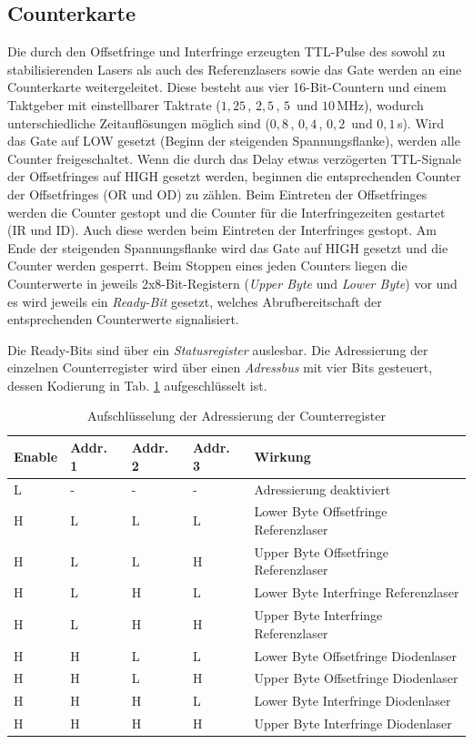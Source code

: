 \subsection{Counterkarte}\label{subsec:counterkarte}
Die durch den Offsetfringe und Interfringe erzeugten
TTL-Pulse des sowohl zu stabilisierenden Lasers als auch des Referenzlasers
sowie das Gate werden an eine Counterkarte weitergeleitet. Diese besteht aus
vier 16-Bit-Countern und einem Taktgeber mit einstellbarer Taktrate ($1,25\,$,
$2,5\,$, $5\,$ und $10\,$MHz), wodurch unterschiedliche Zeitauflösungen möglich
sind ($0,8\,$, $0,4\,$, $0,2\,$ und $0,1\,$\textmu s).
Wird das Gate auf LOW gesetzt (Beginn der steigenden Spannungsflanke), werden
alle Counter freigeschaltet. Wenn die durch
das Delay etwas verzögerten TTL-Signale der Offsetfringes auf HIGH gesetzt werden, beginnen die
entsprechenden Counter der Offsetfringes (OR und OD) zu zählen. Beim Eintreten
der Offsetfringes werden die Counter gestopt und die Counter für die
Interfringezeiten gestartet (IR und ID). Auch diese werden beim Eintreten der
Interfringes gestopt. Am Ende der steigenden Spannungsflanke wird das Gate auf
HIGH gesetzt und die Counter werden gesperrt. Beim Stoppen eines jeden Counters
liegen die Counterwerte in jeweils 2x8-Bit-Registern (\textit{Upper Byte} und \textit{Lower Byte}) vor und es wird jeweils ein
\textit{Ready-Bit} gesetzt, welches Abrufbereitschaft der entsprechenden
Counterwerte signalisiert.\par
Die Ready-Bits sind über ein \textit{Statusregister} auslesbar. Die Adressierung
der einzelnen Counterregister wird über einen \textit{Adressbus} mit vier Bits
gesteuert, dessen Kodierung in Tab. \ref{tab:adressbus_kodierung} aufgeschlüsselt ist.
\begin{table}
	\begin{tabular}{p{}p{}p{}p{}|p{}}
		\toprule
		Enable & Addr. 1 & Addr. 2 & Addr. 3 & Wirkung\\
		\midrule[1px]
		\hline
		L & - & - & - & Adressierung deaktiviert\\
		H & L & L & L & Lower Byte Offsetfringe Referenzlaser\\
		H & L & L & H & Upper Byte Offsetfringe Referenzlaser\\
		H & L & H & L & Lower Byte Interfringe Referenzlaser\\
		H & L & H & H & Upper Byte Interfringe Referenzlaser\\
		H & H & L & L & Lower Byte Offsetfringe Diodenlaser\\
		H & H & L & H & Upper Byte Offsetfringe Diodenlaser\\
		H & H & H & L & Lower Byte Interfringe Diodenlaser\\
		H & H & H & H & Upper Byte Interfringe Diodenlaser\\
		\bottomrule[1px]
	\end{tabular}
	\caption[Adressierung Counterregister]{Aufschlüsselung der Adressierung der
	Counterregister}
	\label{tab:adressbus_kodierung}
\end{table}
